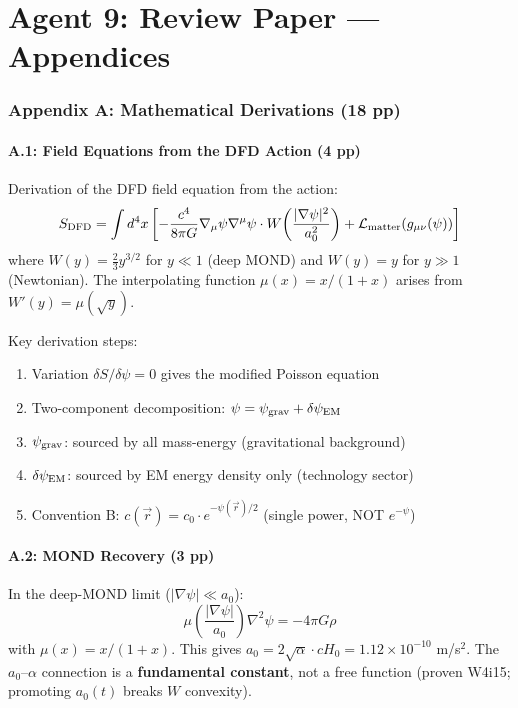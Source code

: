 \documentclass[11pt,a4paper]{article}
\begin{document}
\part{Agent 9: Review Paper --- Appendices}
\label{part:review-appendices}

\section{Appendix A: Mathematical Derivations (18 pp)}

\subsection{A.1: Field Equations from the DFD Action (4 pp)}

Derivation of the DFD field equation from the action:
\begin{equation}
S_{\rm DFD} = \int d^4x \left[ -\frac{c^4}{8\pi G} \nabla_\mu \psi \nabla^\mu \psi \cdot W\!\left(\frac{|\nabla\psi|^2}{a_0^2}\right) + \mathcal{L}_{\rm matter}(g_{\mu\nu}(\psi)) \right]
\end{equation}
where $W(y) = \frac{2}{3}y^{3/2}$ for $y \ll 1$ (deep MOND) and $W(y) = y$ for $y \gg 1$ (Newtonian). The interpolating function $\mu(x) = x/(1+x)$ arises from $W'(y) = \mu(\sqrt{y})$.

Key derivation steps:
\begin{enumerate}
\item Variation $\delta S / \delta \psi = 0$ gives the modified Poisson equation
\item Two-component decomposition: $\psi = \psi_{\rm grav} + \delta\psi_{\rm EM}$
\item $\psi_{\rm grav}$: sourced by all mass-energy (gravitational background)
\item $\delta\psi_{\rm EM}$: sourced by EM energy density only (technology sector)
\item Convention B: $c(\vec{r}) = c_0 \cdot e^{-\psi(\vec{r})/2}$ (single power, NOT $e^{-\psi}$)
\end{enumerate}

\subsection{A.2: MOND Recovery (3 pp)}

In the deep-MOND limit ($|\nabla\psi| \ll a_0$):
\begin{equation}
\mu\!\left(\frac{|\nabla\psi|}{a_0}\right) \nabla^2 \psi = -4\pi G \rho
\end{equation}
with $\mu(x) = x/(1+x)$. This gives $a_0 = 2\sqrt{\alpha} \cdot cH_0 = 1.12 \times 10^{-10}$ m/s$^2$. The $a_0$--$\alpha$ connection is a \textbf{fundamental constant}, not a free function (proven W4i15; promoting $a_0(t)$ breaks $W$ convexity).
\end{document}
